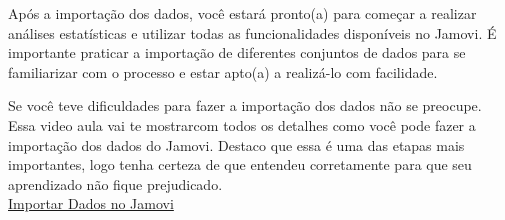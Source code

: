 Após a importação dos dados, você estará pronto(a) para começar a realizar análises estatísticas e utilizar todas as funcionalidades disponíveis no Jamovi. É importante praticar a importação de diferentes conjuntos de dados para se familiarizar com o processo e estar apto(a) a realizá-lo com facilidade.

\begin{tcolorbox}[colback=white,colframe=green,title= Dica de Conteúdo]
  Se você teve dificuldades para fazer a importação dos dados não se preocupe. Essa video aula vai te mostrarcom todos os detalhes como você pode fazer a importação dos dados do Jamovi. Destaco que essa é uma das etapas mais importantes, logo tenha certeza de que entendeu corretamente para que seu aprendizado não fique prejudicado.\\
  \faYoutube{} \href{https://www.youtube.com/watch?v=NIpt0wIq5pc&t=1s}{Importar Dados no Jamovi}
\end{tcolorbox}